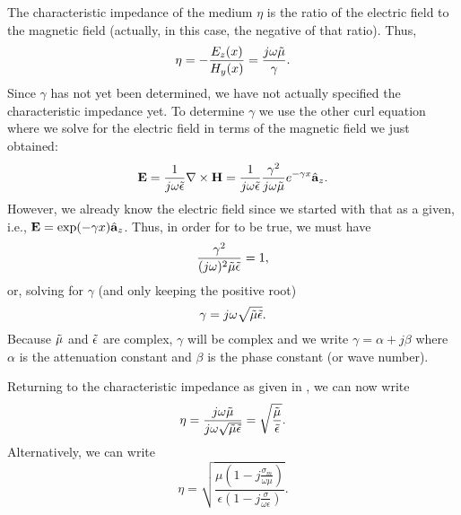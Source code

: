 The characteristic impedance of the medium $\eta$ is the ratio of the
electric field to the magnetic field (actually, in this case, the
negative of that ratio).  Thus,
\begin{equation}
  \eta = -\frac{E_z(x)}{H_y(x)} = \frac{j\omega\tilde{\mu}}{\gamma}.
  \label{eq:almostEta}
\end{equation}
Since $\gamma$ has not yet been determined, we have not actually
specified the characteristic impedance yet.  To determine $\gamma$ we
use the other curl equation where we solve for the electric field in
terms of the magnetic field we just obtained:
\begin{equation}
  \mathbf{E} = \frac{1}{j\omega\tilde{\epsilon}}\nabla\times\mathbf{H}
        = \frac{1}{j\omega\tilde{\epsilon}}
          \frac{\gamma^2}{j\omega\tilde{\mu}}e^{-\gamma x} \hat{\mathbf{a}}_{z}.
  \label{eq:eEqualsE}
\end{equation}
However, we already know the electric field since we started with that
as a given, i.e., $\mathbf{E} = \exp(-\gamma x)\hat{\mathbf{a}}_{z}$.  Thus, in
order for  to be true, we must have
\begin{equation}
  \frac{\gamma^2}{(j\omega)^2\tilde{\mu}\tilde{\epsilon}} = 1,
\end{equation}
or, solving for $\gamma$ (and only keeping the positive root)
\begin{equation}
  \gamma = j\omega\sqrt{\tilde{\mu}\tilde{\epsilon}}.
\end{equation}
Because $\tilde{\mu}$ and $\tilde{\epsilon}$ are complex, $\gamma$ will be complex and
we write $\gamma=\alpha + j\beta$ where $\alpha$ is the attenuation
constant and $\beta$ is the phase constant (or wave number).

Returning to the characteristic impedance as given in
, we can now write
\begin{equation}
  \eta = \frac{j\omega\tilde{\mu}}{j\omega\sqrt{\tilde{\mu}\tilde{\epsilon}}}
       = \sqrt{\frac{\tilde{\mu}}{\tilde{\epsilon}}}.
\end{equation}
Alternatively, we can write
\begin{equation}
  \eta = \sqrt{\frac{\mu\left(1-j\frac{\sigma_m}{\omega\mu}\right)}
              {\epsilon\left(1-j\frac{\sigma}{\omega\epsilon}\right)}}.
\end{equation}

